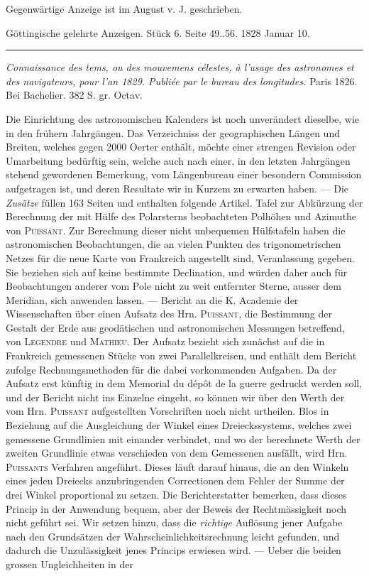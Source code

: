 \clearpage
{}
\hypertarget{native-650-lower}{}
\expandafter\def\csname HistoricalNoteText37\endcsname{Gegenwärtige Anzeige ist im August v. J. geschrieben.}
\begin{center}\small Göttingische gelehrte Anzeigen. Stück 6. Seite 49..56. 1828 Januar 10.\\[3pt]\rule{.72\linewidth}{.3pt}\end{center}

\emph{Connaissance des tems, ou des mouvemens célestes, à l'usage des astronomes et des navigateurs, pour l'an \textup{1829}. Publiée par le bureau des longitudes.} Paris 1826. Bei Bachelier. 382 S. gr. Octav. 

Die Einrichtung des astronomischen Kalenders ist noch unverändert dieselbe, wie in den frühern Jahrgängen. Das Verzeichniss der geographischen Längen und Breiten, welches gegen 2000 Oerter enthält, möchte einer strengen Revision oder Umarbeitung bedürftig sein, welche auch nach einer, in den letzten Jahrgängen stehend gewordenen Bemerkung, vom Längenbureau einer besondern Commission aufgetragen ist, und deren Resultate wir in Kurzem zu erwarten haben. --- Die \emph{Zusätze} füllen 163 Seiten und enthalten folgende Artikel. Tafel zur Abkürzung der Berechnung der mit Hülfe des Polarsterns beobachteten Polhöhen und Azimuthe von \textsc{Puissant}. Zur Berechnung dieser nicht unbequemen Hülfstafeln haben die astronomischen Beobachtungen, die an vielen Punkten des trigonometrischen Netzes für die neue Karte von Frankreich angestellt sind, Veranlassung gegeben. Sie beziehen sich auf keine bestimmte Declination, und würden daher auch für Beobachtungen anderer vom Pole nicht zu weit entfernter Sterne, ausser dem Meridian, sich anwenden lassen. --- Bericht an die K. Academie der Wissenschaften über einen Aufsatz des Hrn. \textsc{Puissant}, die Bestimmung der Gestalt der Erde aus geodätischen und astronomischen Messungen betreffend, von \textsc{Legendre} und \textsc{Mathieu}. Der Aufsatz bezieht sich zunächst auf die in Frankreich gemessenen Stücke von zwei Parallelkreisen, und enthält dem Bericht  zufolge Rechnungsmethoden für die dabei vorkommenden Aufgaben. Da der Aufsatz erst künftig in dem Memorial du dépôt de la guerre gedruckt werden soll, und der Bericht nicht ins Einzelne eingeht, so können wir über den Werth der vom Hrn. \textsc{Puissant} aufgestellten Vorschriften noch nicht urtheilen. Blos in Beziehung auf die Ausgleichung der Winkel eines Dreieckssystems, welches zwei gemessene Grundlinien mit einander verbindet, und wo der berechnete Werth der zweiten Grundlinie etwas verschieden von dem Gemessenen ausfällt, wird Hrn. \textsc{Puissants} Verfahren angeführt. Dieses läuft darauf hinaus, die an den Winkeln eines jeden Dreiecks anzubringenden Correctionen dem Fehler der Summe der drei Winkel proportional zu setzen. Die Berichterstatter bemerken, dass dieses Princip in der Anwendung bequem, aber der Beweis der Rechtmässigkeit noch nicht geführt sei. Wir setzen hinzu, dass die \emph{richtige} Auflösung jener Aufgabe nach den Grundsätzen der Wahrscheinlichkeitsrechnung leicht gefunden, und dadurch die Unzulässigkeit jenes Princips erwiesen wird. --- Ueber die beiden grossen Ungleichheiten in der 